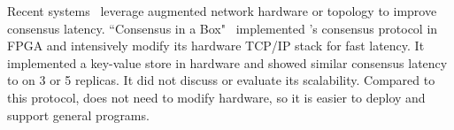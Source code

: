 % 
% 






  Recent
systems~\cite{consensusbox:nsdi16,specpaxos:nsdi15,nopaxos:osdi16,
netpaxos:sosr15} leverage augmented network hardware or topology to improve 
\paxos consensus latency. ``Consensus in a Box"~\cite{consensusbox:nsdi16} 
implemented \zookeeper's consensus protocol in FPGA and intensively modify its 
hardware TCP/IP stack for fast latency. It implemented a key-value store in 
hardware and showed similar consensus latency to \xxx on 3 or 5 replicas. It did 
not discuss or evaluate its scalability. Compared to this protocol, \xxx does 
not need to modify hardware, so it is easier to deploy and support general 
programs.

